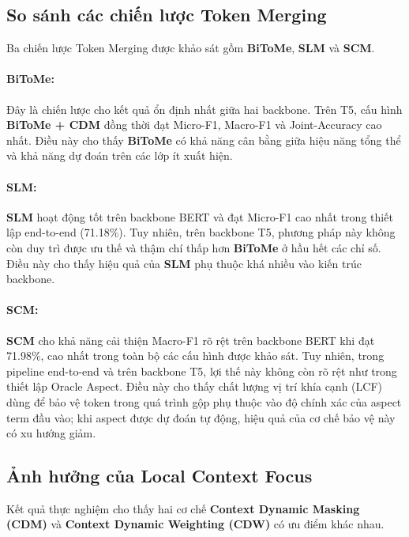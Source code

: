 \subsection{So sánh các chiến lược Token Merging}

Ba chiến lược Token Merging được khảo sát gồm \textbf{BiToMe},
\textbf{SLM} và \textbf{SCM}.

\paragraph{\textbf{BiToMe}:}

Đây là chiến lược cho kết quả ổn định nhất giữa hai backbone.
Trên T5, cấu hình \textbf{BiToMe + CDM} đồng thời đạt Micro-F1, Macro-F1 và
Joint-Accuracy cao nhất.
Điều này cho thấy \textbf{BiToMe} có khả năng cân bằng giữa hiệu năng
tổng thể và khả năng dự đoán trên các lớp ít xuất hiện.

\paragraph{\textbf{SLM}:}

\textbf{SLM} hoạt động tốt trên backbone BERT và đạt
Micro-F1 cao nhất trong thiết lập end-to-end (71.18\%).
Tuy nhiên, trên backbone T5, phương pháp này không còn duy trì được ưu
thế và thậm chí thấp hơn \textbf{BiToMe} ở hầu hết các chỉ số.
Điều này cho thấy hiệu quả của \textbf{SLM} phụ thuộc khá
nhiều vào kiến trúc backbone.

\paragraph{\textbf{SCM}:}

\textbf{SCM} cho khả năng cải thiện Macro-F1 rõ rệt trên
backbone BERT khi đạt 71.98\%, cao nhất trong toàn bộ các cấu hình
được khảo sát.
Tuy nhiên, trong pipeline end-to-end và trên backbone T5, lợi thế này
không còn rõ rệt như trong thiết lập Oracle Aspect.
Điều này cho thấy chất lượng vị trí khía cạnh (LCF) dùng để bảo vệ token
trong quá trình gộp phụ thuộc vào độ chính xác của aspect term đầu vào;
khi aspect được dự đoán tự động, hiệu quả của cơ chế bảo vệ này có xu
hướng giảm.

\subsection{Ảnh hưởng của Local Context Focus}

Kết quả thực nghiệm cho thấy hai cơ chế \textbf{Context Dynamic Masking (CDM)}
và \textbf{Context Dynamic Weighting (CDW)} có ưu điểm khác nhau.

